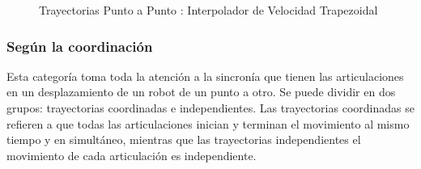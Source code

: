            \begin{figure}[htb]
             \centering
             \caption{Trayectorias Punto a Punto
: Interpolador de Velocidad Trapezoidal \cite{tray_utec}}
             \label{f:cap4_tray_6}
        \end{figure}            
            
            
            
        
        \subsubsection{Según la coordinación }
            Esta categoría toma toda la atención a la sincronía que tienen las articulaciones en un desplazamiento de un robot de un punto a otro. Se puede dividir en dos grupos: trayectorias coordinadas e independientes. Las trayectorias coordinadas se refieren a que todas las articulaciones inician y terminan el movimiento al mismo tiempo y en simultáneo, mientras que las trayectorias independientes el movimiento de cada articulación es independiente.
        
                 \newpage   

        
        
